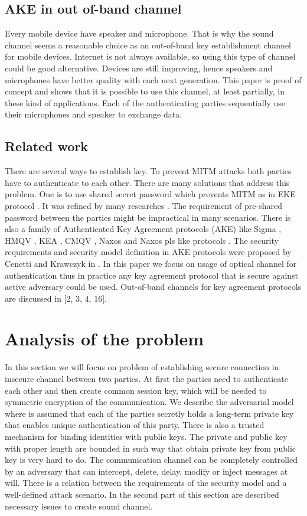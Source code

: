 \documentclass[11pt,titlepage]{article}
\theoremstyle{plain}
\begin{document}
\subsection{AKE in out of-band channel}
Every mobile device have speaker and microphone. That is why the sound channel seems a reasonable choice as an out-of-band key establishment channel for mobile devices. Internet is not always available, so using this type of channel could be good alternative. Devices are still improving, hence speakers and microphones have better quality with each next generation. This paper is proof of concept and shows that it is possible to use this channel, at least partially, in these kind of applications. Each of the authenticating parties sequentially use their microphones and speaker to exchange data.


\subsection{Related work}
There are several ways to establish key. To prevent MITM attacks both parties have to authenticate to each other. There are many solutions that address this problem. One is to use shared secret password which prevents MITM as in EKE protocol \cite{EKE}. It was refined by many researches \cite{EKE, EKE2}. The requirement of pre-shared password between the parties might be impractical in many scenarios. There is also a family of Authenticated Key Agreement protocols (AKE) like Sigma \cite{sign_mac}, HMQV \cite{HMQV}, KEA \cite{KEA}, CMQV \cite{CMQV}, Naxos and Naxos pls like protocols \cite{AMA, NAXOS}. The security requirements and security model definition in AKE protocols were proposed by Cenetti and Krawczyk in \cite{cankraw1, cankraw2}. In this paper we focus on usage of optical channel for authentication thus in practice any key agreement protocol that is secure against active adversary could be used. Out-of-band channels for key agreement protocols are discussed in [2, 3, 4, 16].

\section{Analysis of the problem}

In this section we will focus on problem of establishing secure connection in insecure channel between two parties. At first the parties need to authenticate each other and then create common session key, which will be needed to symmetric encryption of the communication. We describe the adversarial model where is assumed that each of the parties secretly holds a long-term private key that enables unique authentication of this party. There is also a trusted mechanism for binding identities with public keys. The private and public key with proper length are bounded in such way that obtain private key from public key is very hard to do. The communication channel can be completely controlled by an adversary that can intercept, delete, delay, modify or inject messages at will. There is a relation between the requirements of the security model and a well-defined attack scenario. In the second part of this section are described necessary issues to create sound channel.
\end{document}
